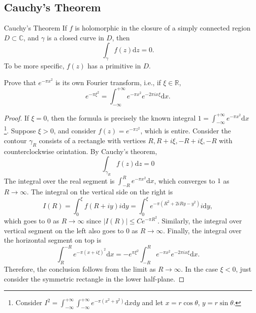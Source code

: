 \subsection{Cauchy's Theorem}

\begin{theorem}{Cauchy's Theorem}{}
  If $f$ is holomorphic in the closure of a simply connected region $D \subset \mathbb{C}$,
  and $\gamma$ is a closed curve in $D$, then
  \begin{equation}
    \int_{\gamma} f(z)\mathrm{d} z = 0.
  \end{equation}
  To be more specific, $f(z)$ has a primitive in $D$.
\end{theorem}

\begin{example}{}{}
  Prove that $e^{-\pi x^2}$ is its own Fourier transform, i.e., if $\xi \in \mathbb{R}$,
  \begin{equation}
    e^{- \pi \xi^2} = \int_{-\infty}^{+\infty} e^{-\pi x^2} e^{-2\pi i x \xi} \mathrm{d} x.
  \end{equation}
\end{example}

\begin{proof}
  If $\xi = 0$, then the formula is precisely the known integral $1 = \int_{-\infty}^{+\infty} e^{-\pi x^2}\mathrm{d} x$
  \footnote{Consider $I^2 = \int_{-\infty}^{+\infty}\int_{-\infty}^{+\infty} e^{-\pi (x^2 + y^2)}\mathrm{d} x \mathrm{d}y$
    and let $x = r \cos \theta$, $y = r\sin \theta$.}.
  Suppose $\xi > 0$, and consider $f(z) = e^{-\pi z^2}$, which is entire.
  Consider the contour $\gamma_R$ consists of a rectangle with vertices
  $R, R+i\xi, -R+i\xi, -R$ with counterclockwise orintation.
  By Cauchy's theorem, 
  \begin{equation}
    \int_{\gamma_R} f(z)\mathrm{d} z = 0
  \end{equation}
  The integral over the real segment is $\int_{-R}^R e^{-\pi x^2} \mathrm{d} x$,
  which converges to $1$ as $R \rightarrow \infty$.
  The integral on the vertical side on the right is
  \begin{equation}
    I(R) = \int^{\xi}_0 f(R + iy)i \mathrm{d} y = \int_0^{\xi} e^{-\pi (R^2 + 2i Ry - y^2)}i \mathrm{d} y,
  \end{equation}
  which goes to $0$ as $R \rightarrow \infty$ since $|I(R)| \leq C e^{-\pi R^2}$.
  Similarly, the integral over vertical segment on the left also goes to $0$ as $R \rightarrow \infty$.
  Finally, the integral over the horizontal segment on top is
  \begin{equation}
    \int_R^{-R} e^{-\pi (x+i\xi)^2}\mathrm{d} x = - e^{\pi \xi^2} \int_{-R}^R e^{-\pi x^2}e^{-2\pi i x \xi}\mathrm{d} x.
  \end{equation}
  Therefore, the conclusion follows from the limit as $R \rightarrow \infty$.
  In the case $\xi < 0$, just consider the symmetric rectangle in the lower half-plane.
\end{proof}

